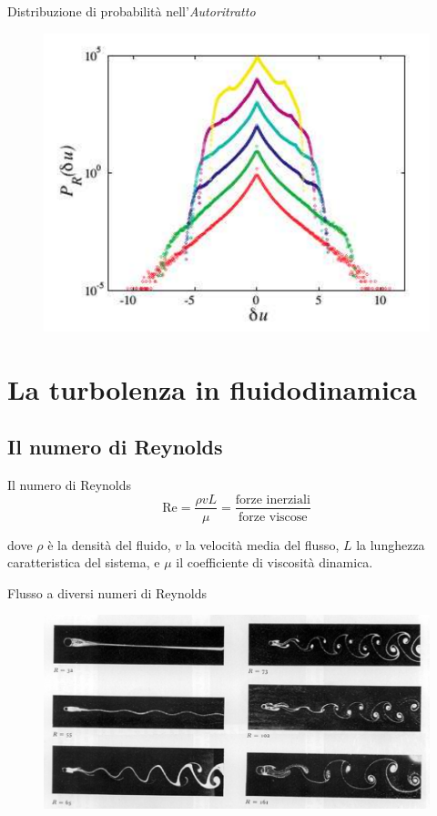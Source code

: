 \documentclass[11pt]{beamer}
\begin{document}
\begin{frame}{Distribuzione di probabilità nell'\emph{Autoritratto}}
\begin{figure}
\centering
\includegraphics[scale=0.3]{PDF_self_portrait.png}
\end{figure}
\end{frame}

\section{La turbolenza in fluidodinamica}

\subsection{Il numero di Reynolds}

\begin{frame}{Il numero di Reynolds}
\begin{equation}
\text{Re} = \frac{\rho v L}{\mu} = \frac{\text{forze inerziali}}{\text{forze viscose}}
\end{equation}

dove $\rho$ è la densità del fluido, $v$ la velocità media del flusso, $L$ la lunghezza caratteristica del sistema, e $\mu$ il coefficiente di viscosità dinamica.
\end{frame}

\begin{frame}{Flusso a diversi numeri di Reynolds}
\begin{figure}
\centering
\includegraphics[scale=2.7]{allees.jpg}
\end{figure}
\end{frame}
\end{document}
